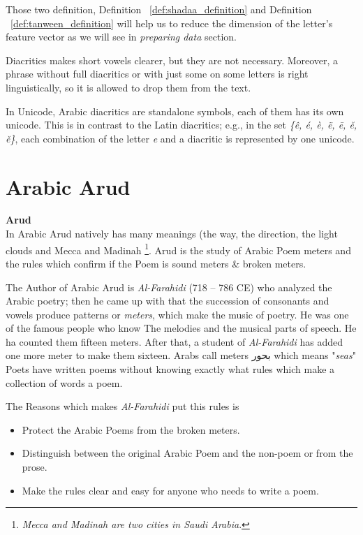 Those two definition, Definition ~\ref{def:shadaa_definition} and Definition ~\ref{def:tanween_definition}  will help us to reduce the dimension of the letter's feature vector as we will see in \textit{preparing data} section.


Diacritics makes short vowels clearer, but they are not necessary.
Moreover, a phrase without full diacritics or with just some on some letters is
right linguistically, so it is allowed to drop them from the text.

In Unicode, Arabic diacritics are standalone symbols, each of them has its own
unicode. This is in contrast to the Latin diacritics; e.g., in the set
\textit{\{ê, é, è, ë, ē, ĕ, ě\}}, each combination of the letter \textit{e} and a diacritic is represented by one unicode.

\newpage

\section{Arabic Arud}
 


\begin{definition}\label{def:arud}
  \textbf{Arud} \hfill \\
  In Arabic Arud natively has many meanings (the way, the direction, the light clouds and Mecca and Madinah \footnote{\textit{Mecca and Madinah are two cities in  Saudi Arabia}.}\cite{AlQuaed}. Arud is the study of Arabic Poem meters and the rules which confirm if the Poem is sound meters \& broken meters.
\end{definition}
 
The Author of Arabic Arud  is \textit{Al-Farahidi} (718 – 786 CE) who analyzed the Arabic poetry; then he came up with that the succession of consonants and vowels produce patterns or \textit{meters}, which make the music of poetry. He was one of the famous people who know The melodies and the musical parts of speech. He ha counted them fifteen meters.  After that, a student of \textit{Al-Farahidi} has added one more meter to make them sixteen. Arabs call meters \textarabic{بحور} which means "\textit{seas}" Poets have written poems without knowing exactly what rules which make a collection of words a poem.

The Reasons which makes \textit{Al-Farahidi} put this rules is

  \begin{itemize}
  \item Protect the Arabic Poems from the broken meters.
  \item Distinguish between the original Arabic Poem and the non-poem or from the prose.
    \item Make the rules clear and easy for anyone who needs to write a poem.
  \end{itemize}

